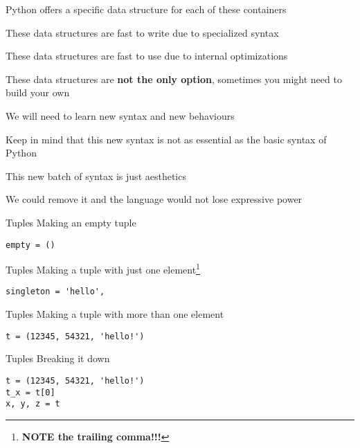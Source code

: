\documentclass{beamer}
\begin{document}
\begin{slide}{
\item Python offers a specific data structure for each of these containers
\item These data structures are fast to write due to specialized syntax
\item These data structures are fast to use due to internal optimizations
\pause
\item These data structures are \textbf{not the only option}, sometimes you might need to build your own
}\end{slide}

\begin{slide}{
\item We will need to learn new syntax and new behaviours
\item Keep in mind that this new syntax is not as essential as the basic syntax of Python
\item This new batch of syntax is just aesthetics
\pause
\item We could remove it and the language would not lose expressive power
}\end{slide}

\begin{frame}[fragile]{Tuples}
Making an empty tuple
\begin{lstlisting}
empty = ()
\end{lstlisting}
\end{frame}

\begin{frame}[fragile]{Tuples}
Making a tuple with just one element\footnote{\textbf{NOTE the trailing comma!!!}}
\begin{lstlisting}
singleton = 'hello',
\end{lstlisting}
\end{frame}

\begin{frame}[fragile]{Tuples}
Making a tuple with more than one element
\begin{lstlisting}
t = (12345, 54321, 'hello!')
\end{lstlisting}
\end{frame}

\begin{frame}[fragile]{Tuples}
Breaking it down
\begin{lstlisting}
t = (12345, 54321, 'hello!')
t_x = t[0]
x, y, z = t
\end{lstlisting}
\end{frame}
\end{document}
